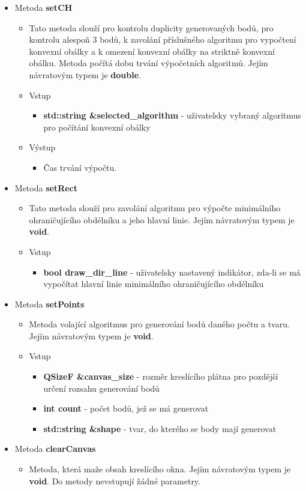 \documentclass[a4paper, 12pt]{article}
\begin{document}
\begin{itemize}
	\item Metoda \textbf{setCH}
		\begin{itemize}
			\item Tato metoda slouží pro kontrolu duplicity generovaných bodů, pro kontrolu alespoň 3 bodů, k zavolání příslušného algoritmu pro vypočtení konvexní obálky a k omezení konvexní obálky na striktně konvexní obálku. Metoda počítá dobu trvání výpočetních algoritmů. Jejím návratovým typem je \textbf{double}.
			\item Vstup
				\begin{itemize}
					\item \textbf{std::string \&selected\_algorithm} - uživatelsky vybraný algoritmus pro počítání konvexní obálky
				\end{itemize}
			\item Výstup
				\begin{itemize}
					\item Čas trvání výpočtu.
				\end{itemize}
		\end{itemize}	

	\item Metoda \textbf{setRect}
		\begin{itemize}
			\item Tato metoda slouží pro zavolání algoritmu pro výpočte minimálního ohraničujícího obdélníku a jeho hlavní linie. Jejím návratovým typem je \textbf{void}.
			\item Vstup
				\begin{itemize}
					\item \textbf{bool draw\_dir\_line} - uživatelsky nastavený indikátor, zda-li se má vypočítat hlavní linie minimálního ohraničujícího obdélníku
				\end{itemize}
		\end{itemize}

	\item Metoda \textbf{setPoints}
		\begin{itemize}
			\item Metoda volající algoritmus pro generování bodů daného počtu a tvaru. Jejím návratovým typem je \textbf{void}.
			\item Vstup
				\begin{itemize}
					\item \textbf{QSizeF \&canvas\_size} - rozměr kreslícího plátna pro pozdější určení rozsahu generování bodů
					\item \textbf{int count} - počet bodů, jež se má generovat
					\item \textbf{std::string \&shape} - tvar, do kterého se body mají generovat
				\end{itemize}
		\end{itemize}

	\item Metoda \textbf{clearCanvas}
		\begin{itemize}
			\item Metoda, která maže obsah kreslícího okna. Jejím návratovým typem je \textbf{void}. Do metody nevstupují žádné parametry.
		\end{itemize}
\end{itemize}
\end{document}
